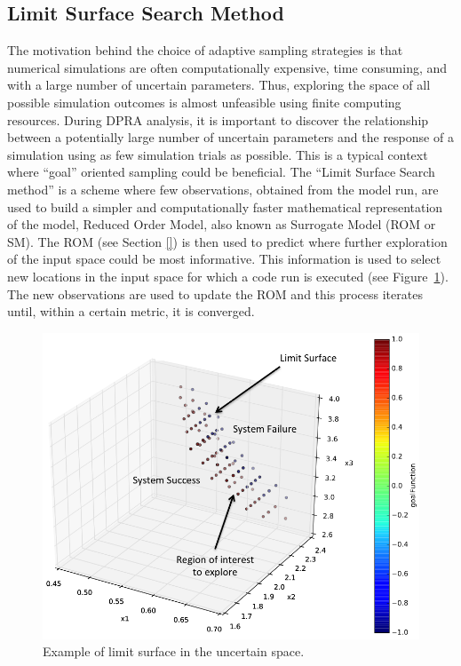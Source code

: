 \subsection{Limit Surface Search Method}
\label{sub:LS}
The motivation behind the choice of adaptive sampling strategies is that numerical 
simulations are often computationally expensive, time consuming, and 
with a large number of uncertain parameters. Thus, exploring the space 
of all possible simulation outcomes is almost unfeasible using finite 
computing resources. During DPRA analysis, it is 
important to discover the relationship between a potentially large 
number of uncertain parameters and the response of a simulation using 
as few simulation trials as possible.
This is a typical context where ``goal'' oriented sampling could be 
beneficial. The ``Limit 
Surface Search method'' is a scheme  where few observations, obtained 
from the model run, are used to build a simpler and computationally faster 
mathematical representation of the model, Reduced Order Model, also 
known as Surrogate Model (ROM or SM). The ROM (see Section \ref{}) is then 
used to predict where further exploration of the input space could be 
most informative. This information is used to select new locations in the 
input space for which a code run is executed (see 
Figure~\ref{fig:ExampleLSschematic}). The new 
observations are used to update the ROM and this process iterates 
until, within a certain metric, it is converged.
\begin{figure}[h!]
  \centering
  \includegraphics[width=1.0\textwidth]  {pics/ExampleLSschematic.png}
  \caption{Example of limit surface in the uncertain space.}
  \label{fig:ExampleLSschematic}
\end{figure}

